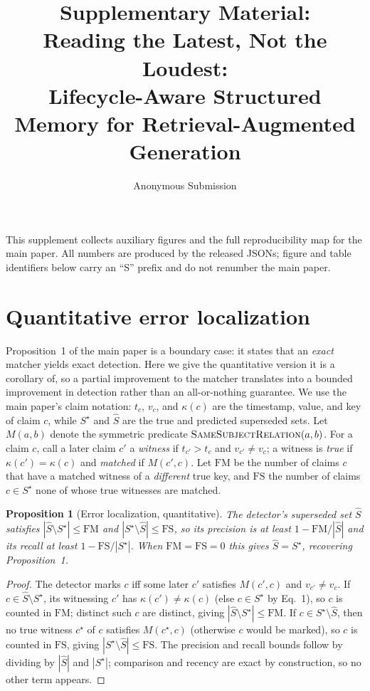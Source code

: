 \documentclass[letterpaper]{article}
\title{Supplementary Material:\\
Reading the Latest, Not the Loudest:\\
Lifecycle-Aware Structured Memory for Retrieval-Augmented Generation}
\author{Anonymous Submission}
\newtheorem{proposition}{Proposition}
\begin{document}
\maketitle

This supplement collects auxiliary figures and the full reproducibility map for the main paper. All numbers are produced by the released JSONs; figure and table identifiers below carry an ``S'' prefix and do not renumber the main paper.

\section{Quantitative error localization}
\label{sec:supp_theory}
Proposition~1 of the main paper is a boundary case: it states that an \emph{exact} matcher yields exact detection. Here we give the quantitative version it is a corollary of, so a partial improvement to the matcher translates into a bounded improvement in detection rather than an all-or-nothing guarantee. We use the main paper's claim notation: $t_c$, $v_c$, and $\kappa(c)$ are the timestamp, value, and key of claim $c$, while $S^\star$ and $\hat S$ are the true and predicted superseded sets. Let $M(a,b)$ denote the symmetric predicate $\textsc{SameSubjectRelation}(a,b)$. For a claim $c$, call a later claim $c'$ a \emph{witness} if $t_{c'}>t_c$ and $v_{c'}\neq v_c$; a witness is \emph{true} if $\kappa(c'){=}\kappa(c)$ and \emph{matched} if $M(c',c)$. Let $\mathrm{FM}$ be the number of claims $c$ that have a matched witness of a \emph{different} true key, and $\mathrm{FS}$ the number of claims $c\in S^\star$ none of whose true witnesses are matched.

\begin{proposition}[Error localization, quantitative]
\label{prop:supp_quant}
The detector's superseded set $\hat S$ satisfies $|\hat S\setminus S^\star|\le \mathrm{FM}$ and $|S^\star\setminus \hat S|\le \mathrm{FS}$, so its precision is at least $1-\mathrm{FM}/|\hat S|$ and its recall at least $1-\mathrm{FS}/|S^\star|$. When $\mathrm{FM}{=}\mathrm{FS}{=}0$ this gives $\hat S=S^\star$, recovering Proposition~1.
\end{proposition}
\begin{proof}
The detector marks $c$ iff some later $c'$ satisfies $M(c',c)$ and $v_{c'}\neq v_c$. If $c\in\hat S\setminus S^\star$, its witnessing $c'$ has $\kappa(c')\neq\kappa(c)$ (else $c\in S^\star$ by Eq.~1), so $c$ is counted in $\mathrm{FM}$; distinct such $c$ are distinct, giving $|\hat S\setminus S^\star|\le\mathrm{FM}$. If $c\in S^\star\setminus\hat S$, then no true witness $c^\star$ of $c$ satisfies $M(c^\star,c)$ (otherwise $c$ would be marked), so $c$ is counted in $\mathrm{FS}$, giving $|S^\star\setminus\hat S|\le\mathrm{FS}$. The precision and recall bounds follow by dividing by $|\hat S|$ and $|S^\star|$; comparison and recency are exact by construction, so no other term appears.
\end{proof}
\end{document}
